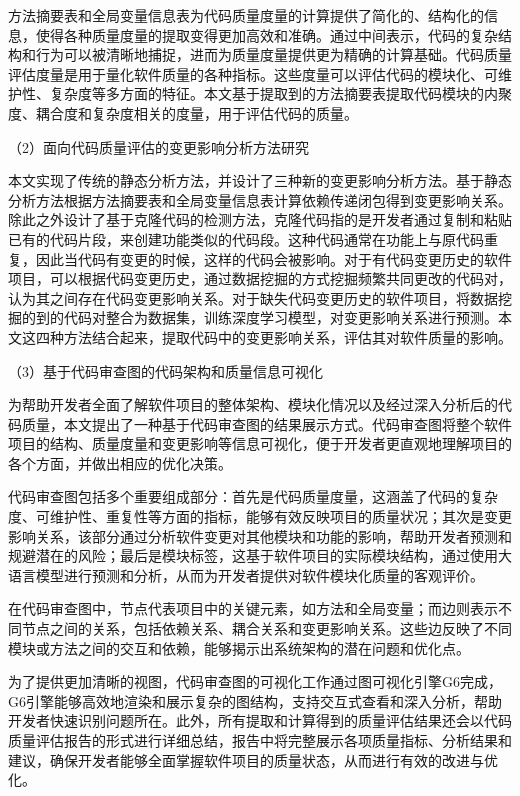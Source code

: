 方法摘要表和全局变量信息表为代码质量度量的计算提供了简化的、结构化的信息，使得各种质量度量的提取变得更加高效和准确。通过中间表示，代码的复杂结构和行为可以被清晰地捕捉，进而为质量度量提供更为精确的计算基础。代码质量评估度量是用于量化软件质量的各种指标。这些度量可以评估代码的模块化、可维护性、复杂度等多方面的特征。本文基于提取到的方法摘要表提取代码模块的内聚度、耦合度和复杂度相关的度量，用于评估代码的质量。

（2）面向代码质量评估的变更影响分析方法研究

本文实现了传统的静态分析方法，并设计了三种新的变更影响分析方法。基于静态分析方法根据方法摘要表和全局变量信息表计算依赖传递闭包得到变更影响关系。除此之外设计了基于克隆代码的检测方法，克隆代码指的是开发者通过复制和粘贴已有的代码片段，来创建功能类似的代码段。这种代码通常在功能上与原代码重复，因此当代码有变更的时候，这样的代码会被影响。对于有代码变更历史的软件项目，可以根据代码变更历史，通过数据挖掘的方式挖掘频繁共同更改的代码对，认为其之间存在代码变更影响关系。对于缺失代码变更历史的软件项目，将数据挖掘的到的代码对整合为数据集，训练深度学习模型，对变更影响关系进行预测。本文这四种方法结合起来，提取代码中的变更影响关系，评估其对软件质量的影响。



（3）基于代码审查图的代码架构和质量信息可视化

为帮助开发者全面了解软件项目的整体架构、模块化情况以及经过深入分析后的代码质量，本文提出了一种基于代码审查图的结果展示方式。代码审查图将整个软件项目的结构、质量度量和变更影响等信息可视化，便于开发者更直观地理解项目的各个方面，并做出相应的优化决策。

代码审查图包括多个重要组成部分：首先是代码质量度量，这涵盖了代码的复杂度、可维护性、重复性等方面的指标，能够有效反映项目的质量状况；其次是变更影响关系，该部分通过分析软件变更对其他模块和功能的影响，帮助开发者预测和规避潜在的风险；最后是模块标签，这基于软件项目的实际模块结构，通过使用大语言模型进行预测和分析，从而为开发者提供对软件模块化质量的客观评价。

在代码审查图中，节点代表项目中的关键元素，如方法和全局变量；而边则表示不同节点之间的关系，包括依赖关系、耦合关系和变更影响关系。这些边反映了不同模块或方法之间的交互和依赖，能够揭示出系统架构的潜在问题和优化点。

为了提供更加清晰的视图，代码审查图的可视化工作通过图可视化引擎G6完成，G6引擎能够高效地渲染和展示复杂的图结构，支持交互式查看和深入分析，帮助开发者快速识别问题所在。此外，所有提取和计算得到的质量评估结果还会以代码质量评估报告的形式进行详细总结，报告中将完整展示各项质量指标、分析结果和建议，确保开发者能够全面掌握软件项目的质量状态，从而进行有效的改进与优化。

